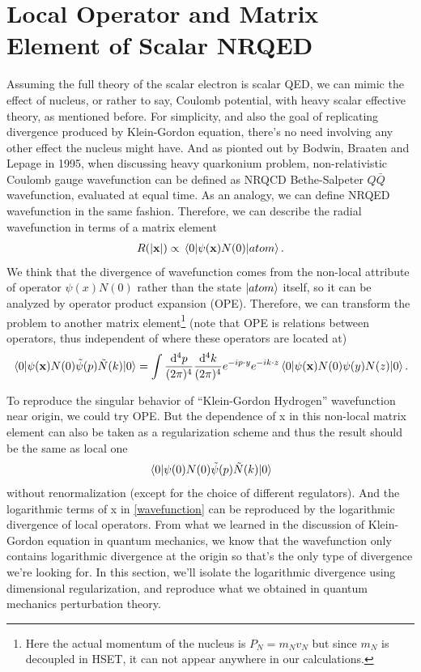 \documentclass[aps,prd,preprint,showkeys,10pt]{revtex4-1}
\begin{document}
\section{Local Operator and Matrix Element of Scalar NRQED}
Assuming the full theory of the scalar electron is scalar QED, we can mimic the effect of nucleus, or rather to say, Coulomb potential, with heavy scalar effective theory, as mentioned before. For simplicity, and also the goal of replicating divergence produced by Klein-Gordon equation, there's no need involving any other effect the nucleus might have. And as pionted out by Bodwin, Braaten and Lepage in 1995\cite{Bodwin1995}, when discussing heavy quarkonium problem, non-relativistic Coulomb gauge wavefunction can be defined as NRQCD Bethe-Salpeter $Q\bar Q$ wavefunction, evaluated at equal time. As an analogy, we can define NRQED wavefunction in the same fashion. Therefore, we can describe the radial wavefunction in terms of a matrix element 
\begin{align}
	R(\abs{\vb{x}})\propto\mel{0}{\psi(\vb{x})N(0)}{atom}.\label{wavefunction}
\end{align}
We think that the divergence of wavefunction comes from the non-local attribute of operator $\psi(x)N(0)$ rather than the state $\ket{atom}$ itself, so it can be analyzed by operator product expansion (OPE)\cite{Lepage:1997cs}. Therefore, we can transform the problem to another matrix element\footnote{Here the actual momentum of the nucleus is $P_N=m_Nv_N$ but since $m_N$ is decoupled in HSET, it can not appear anywhere in our calculations. } (note that OPE is relations between operators, thus independent of where these operators are located at)
\begin{align}	
	\mel{0}{\psi(\vb{x})N(0)\tilde\psi(p)\tilde N(k)}{0}=\int\frac{\dd^4 p}{(2\pi)^4}\frac{\dd^4 k}{(2\pi)^4}e^{-ip\cdot y}e^{-ik\cdot z}\mel{0}{\psi(\vb{x})N(0)\psi(y)N(z)}{0}.\label{NLME}
\end{align}	

To reproduce the singular behavior of ``Klein-Gordon Hydrogen'' wavefunction near origin, we could try OPE. But the dependence of x in this non-local matrix element can also be taken as a regularization scheme and thus the result should be the same as local one
$$\mel{0}{\psi(0)N(0)\tilde\psi(p)\tilde N(k)}{0}$$
without renormalization (except for the choice of different regulators). And the logarithmic terms of x in \eqref{wavefunction} can be reproduced by the logarithmic divergence of local operators. From what we learned in the discussion of Klein-Gordon equation in quantum mechanics, we know that the wavefunction only contains logarithmic divergence at the origin so that's the only type of divergence we're looking for. In this section, we'll isolate the logarithmic divergence using dimensional regularization, and reproduce what we obtained in quantum mechanics perturbation theory. 
\end{document}
